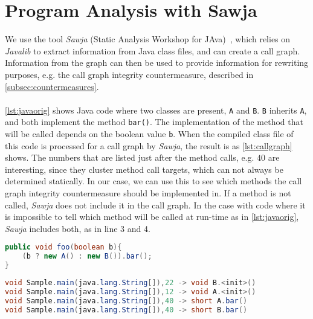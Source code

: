 \section{Program Analysis with Sawja}
We use the tool \textit{Sawja} (Static Analysis Workshop for JAva)~\cite{sawja}, which relies on \textit{Javalib} to extract information from Java class files, and can create a call graph. Information from the graph can then be used to provide information for rewriting purposes, e.g. the call graph integrity countermeasure, described in \cref{subsec:countermeasures}.\\\\
\cref{lst:javaorig} shows Java code where two classes are present, \texttt{A} and \texttt{B}. \texttt{B} inherits \texttt{A}, and both implement the method \texttt{bar()}. The implementation of the method that will be called depends on the boolean value \texttt{b}. When the compiled class file of this code is processed for a call graph by \textit{Sawja}, the result is as \cref{lst:callgraph} shows. The numbers that are listed just after the method calls, e.g. $40$ are interesting, since they cluster method call targets, which can not always be determined statically. In our case, we can use this to see which methods the call graph integrity countermeasure should be implemented in. If a method is not called, \textit{Sawja} does not include it in the call graph.
In the case with code where it is impossible to tell which method will be called at run-time as in \cref{lst:javaorig}, \textit{Sawja} includes both, as in line 3 and 4.

\begin{minipage}{\linewidth}
\begin{lstlisting}[caption=Java sample.,language=Java,label=lst:javaorig]
public void foo(boolean b){
    (b ? new A() : new B()).bar();
}
\end{lstlisting}
\end{minipage}

\begin{minipage}{\linewidth} %
\begin{lstlisting}[caption=Call graph generated by \textit{Sawja}.,language=Java,label=lst:callgraph]
void Sample.main(java.lang.String[]),22 -> void B.<init>()
void Sample.main(java.lang.String[]),12 -> void A.<init>()
void Sample.main(java.lang.String[]),40 -> short A.bar()
void Sample.main(java.lang.String[]),40 -> short B.bar()
\end{lstlisting}
\end{minipage}

